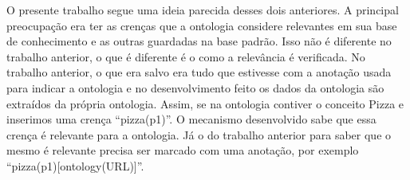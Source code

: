 O presente trabalho segue uma ideia parecida desses dois anteriores. A
principal preocupação era ter as crenças que a ontologia considere relevantes
em sua base de conhecimento e as outras guardadas na base padrão. Isso não é
diferente no trabalho anterior, o que é diferente é o como a relevância é
verificada. No trabalho anterior, o que era salvo era tudo que estivesse com a
anotação usada para indicar a ontologia e no desenvolvimento feito os dados da
ontologia são extraídos da própria ontologia. Assim, se na ontologia contiver
o conceito Pizza e inserimos uma crença ``pizza(p1)''. O mecanismo
desenvolvido sabe que essa crença é relevante para a ontologia. Já o do
trabalho anterior para saber que o mesmo é relevante precisa ser marcado
com uma anotação, por exemplo ``pizza(p1)[ontology(URL)]''.

